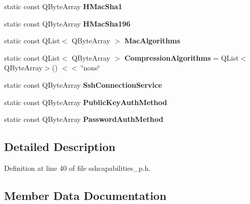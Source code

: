 \begin{DoxyCompactItemize}
static const Q\+Byte\+Array {\bfseries H\+Mac\+Sha1}
\item 
\mbox{\label{class_q_ssh_1_1_internal_1_1_ssh_capabilities_a17cdef64dbb84de8d53b76d6d1c53215}} 
static const Q\+Byte\+Array {\bfseries H\+Mac\+Sha196}
\item 
static const Q\+List$<$ Q\+Byte\+Array $>$ {\bfseries Mac\+Algorithms}
\item 
\mbox{\label{class_q_ssh_1_1_internal_1_1_ssh_capabilities_a698659300e1a10b2d312c0521909a27a}} 
static const Q\+List$<$ Q\+Byte\+Array $>$ {\bfseries Compression\+Algorithms} = Q\+List$<$Q\+Byte\+Array$>$() $<$$<$ \char`\"{}none\char`\"{}
\item 
\mbox{\label{class_q_ssh_1_1_internal_1_1_ssh_capabilities_a91d62c25e4c35d8595dcdc4244a8a068}} 
static const Q\+Byte\+Array {\bfseries Ssh\+Connection\+Service}
\item 
\mbox{\label{class_q_ssh_1_1_internal_1_1_ssh_capabilities_a3dc554002659e61f97bbda30a710e74e}} 
static const Q\+Byte\+Array {\bfseries Public\+Key\+Auth\+Method}
\item 
\mbox{\label{class_q_ssh_1_1_internal_1_1_ssh_capabilities_af3c3b69674288d3a9a192834e991f557}} 
static const Q\+Byte\+Array {\bfseries Password\+Auth\+Method}
\end{DoxyCompactItemize}


\subsection{Detailed Description}


Definition at line 40 of file sshcapabilities\+\_\+p.\+h.



\subsection{Member Data Documentation}
\mbox{\label{class_q_ssh_1_1_internal_1_1_ssh_capabilities_a53553e220137cba903911237b73dbf6c}} 
